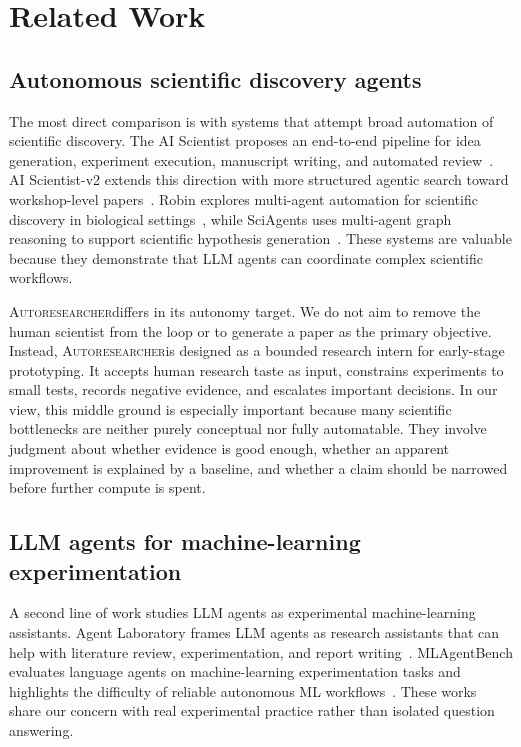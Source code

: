 \documentclass{article}
\newcommand{\sys}{\textsc{Autoresearcher}}
\begin{document}
\section{Related Work}

\subsection{Autonomous scientific discovery agents}

The most direct comparison is with systems that attempt broad automation of scientific discovery. The AI Scientist proposes an end-to-end pipeline for idea generation, experiment execution, manuscript writing, and automated review~\citep{lu2024aiscientist}. AI Scientist-v2 extends this direction with more structured agentic search toward workshop-level papers~\citep{yamada2025aiscientistv2}. Robin explores multi-agent automation for scientific discovery in biological settings~\citep{ghareeb2025robin}, while SciAgents uses multi-agent graph reasoning to support scientific hypothesis generation~\citep{ghafarollahi2024sciagents}. These systems are valuable because they demonstrate that LLM agents can coordinate complex scientific workflows.

\sys differs in its autonomy target. We do not aim to remove the human scientist from the loop or to generate a paper as the primary objective. Instead, \sys is designed as a bounded research intern for early-stage prototyping. It accepts human research taste as input, constrains experiments to small tests, records negative evidence, and escalates important decisions. In our view, this middle ground is especially important because many scientific bottlenecks are neither purely conceptual nor fully automatable. They involve judgment about whether evidence is good enough, whether an apparent improvement is explained by a baseline, and whether a claim should be narrowed before further compute is spent.

\subsection{LLM agents for machine-learning experimentation}

A second line of work studies LLM agents as experimental machine-learning assistants. Agent Laboratory frames LLM agents as research assistants that can help with literature review, experimentation, and report writing~\citep{schmidgall2025agentlab}. MLAgentBench evaluates language agents on machine-learning experimentation tasks and highlights the difficulty of reliable autonomous ML workflows~\citep{huang2023mlagentbench}. These works share our concern with real experimental practice rather than isolated question answering.
\end{document}

